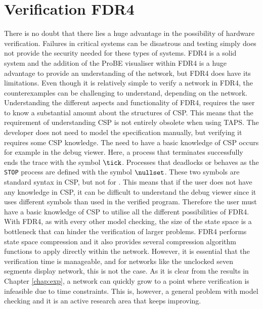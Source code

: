 \section{Verification FDR4}
There is no doubt that there lies a huge advantage in the possibility of hardware verification. Failures in critical systems can be disastrous and testing simply does not provide the security needed for these types of systems. FDR4 is a solid system and the addition of the ProBE visualiser within FDR4 is a huge advantage to provide an understanding of the network, but FDR4 does have its limitations. Even though it is relatively simple to verify a network in FDR4, the counterexamples can be challenging to understand, depending on the network. Understanding the different aspects and functionality of FDR4, requires the user to know a substantial amount about the structures of CSP. This means that the requirement of understanding CSP is not entirely obsolete when using TAPS. The developer does not need to model the specification manually, but verifying it requires some CSP knowledge. The need to have a basic knowledge of CSP occurs for example in the debug viewer. Here, a process that terminates successfully ends the trace with the symbol $\tick$. Processes that deadlocks or behaves as the \texttt{STOP} process are defined with the symbol $\nullset$. These two symbols are standard syntax in CSP, but not for \cspm{}. This means that if the user does not have any knowledge in CSP, it can be difficult to understand the debug viewer since it uses different symbols than used in the verified \cspm{} program. Therefore the user must have a basic knowledge of CSP to utilise all the different possibilities of FDR4. \\

With FDR4, as with every other model checking, the size of the state space is a bottleneck that can hinder the verification of larger problems. FDR4 performs state space compression and it also provides several compression algorithm functions to apply directly within the \cspm{} network.
However, it is essential that the verification time is manageable, and for networks like the unclocked seven segments display network, this is not the case. As it is clear from the results in Chapter \ref{chap:exp}, a network can quickly grow to a point where verification is infeasible due to time constraints. This is, however, a general problem with model checking and it is an active research area that keeps improving.